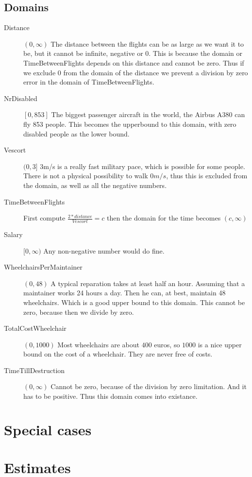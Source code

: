\documentclass[a4paper, 12pt, notitlepage]{report}
\begin{document}
\subsection{Domains}
	\begin{description}
		\item[Distance] $(0,\infty)$ The distance between the flights can be as large as we want it to be, but it cannot be infinite, negative or 0. This is because the domain or TimeBetweenFlights depends on this distance and cannot be zero. Thus if we exclude 0 from the domain of the distance we prevent a division by zero error in the domain of TimeBetweenFlights.
		\item[NrDisabled] $[0,853 ]$ The biggest passenger aircraft in the world, the Airbus A380 can fly 853 people. This becomes the upperbound to this domain, with zero disabled people as the lower bound.   %
		\item[Vescort] $(0,3]$ 3m/s is a really fast military pace, which is possible for some people. There is not a physical possibility to walk $0m/s$, thus this is excluded from the domain, as well as all the negative numbers.
		\item[TimeBetweenFlights] First compute $\frac{2*distance}{Vescort} = c$ then the domain for the time becomes $(c,\infty)$ %
		\item[Salary] $[0,\infty)$ Any non-negative number would do fine.
		\item[WheelchairsPerMaintainer] $(0,48)$ A typical reparation takes at least half an hour. Assuming that a maintainer works 24 hours a day. Then he can, at best, maintain 48 wheelchairs. Which is a good upper bound to this domain. This cannot be zero, because then we divide by zero.
		\item[TotalCostWheelchair] $(0,1000)$ Most wheelchairs are about $400$ euros, so $1000$ is a nice upper bound on the cost of a wheelchair. They are never free of costs. %
		\item[TimeTillDestruction] $(0,\infty)$ Cannot be zero, because of the division by zero limitation. And it has to be positive. Thus this domain comes into existance.
	\end{description}
\section{Special cases}
\section{Estimates}
\end{document}

